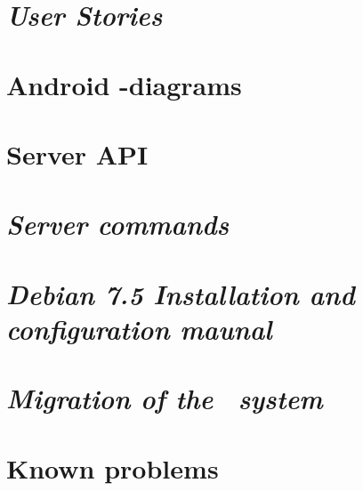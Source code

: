 \begin{appendix}

\chapter{\textit{User Stories}}

\chapter{Android -diagrams}

\chapter{Server API}

\chapter{\textit{Server commands}}

%
\chapter{\textit{Debian 7.5 Installation and configuration maunal}}

\chapter{\textit{Migration of the \appName\ system}}

\chapter{Known problems}
\label{chap:knownProblems}
%
\end{appendix}
